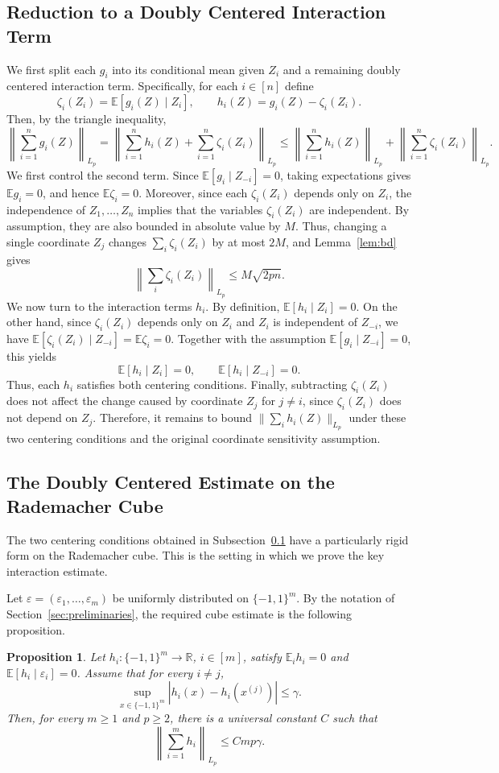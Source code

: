 \documentclass[11pt]{article}
\newtheorem{proposition}{Proposition}
\newcommand{\E}{\mathbb{E}}
\newcommand{\norm}[1]{\left\lVert #1\right\rVert}
\newcommand{\abs}[1]{\left\lvert #1\right\rvert}
\begin{document}
\subsection{Reduction to a Doubly Centered Interaction Term}\label{subsec:reduction}

We first split each $g_i$ into its conditional mean given $Z_i$ and a remaining doubly centered interaction term. Specifically, for each $i \in [n]$  define
\[
\zeta_i(Z_i)=\E[g_i(Z)\mid Z_i], \qquad h_i(Z)=g_i(Z)-\zeta_i(Z_i).
\]
Then, by the triangle inequality, 
\[
\left\|\sum_{i=1}^n g_i(Z) \right\|_{L_p} = \left \| \sum_{i=1}^n h_i(Z) + \sum_{i=1}^n \zeta_i(Z_i) \right\|_{L_p} \le \left\|\sum_{i=1}^n h_i(Z) \right\|_{L_p} + \left\| \sum_{i=1}^n \zeta_i(Z_i) \right\|_{L_p}. 
\]
We first control the second term. Since $\E[g_i\mid Z_{-i}]=0$, taking expectations gives $\E g_i=0$, and hence $\E \zeta_i=0$. Moreover, since each $\zeta_i(Z_i)$ depends only on $Z_i$, the independence of $Z_1,\ldots,Z_n$ implies that the variables $\zeta_i(Z_i)$ are independent. By assumption, they are also bounded in absolute value by $M$. Thus, changing a single coordinate $Z_j$ changes $\sum_i\zeta_i(Z_i)$ by at most $2M$, and Lemma~\ref{lem:bd} gives
\[
\norm{\sum_i \zeta_i(Z_i)}_{L_p} \le M\sqrt{2pn}.
\]
We now turn to the interaction terms $h_i$. By definition, $\E[h_i\mid Z_i]=0$. On the other hand, since $\zeta_i(Z_i)$ depends only on $Z_i$ and $Z_i$ is independent of $Z_{-i}$, we have $\E[\zeta_i(Z_i)\mid Z_{-i}]=\E\zeta_i=0$. Together with the assumption $\E[g_i\mid Z_{-i}]=0$, this yields
\[
\E[h_i\mid Z_i]=0, \qquad \E[h_i\mid Z_{-i}]=0.
\]
Thus, each $h_i$ satisfies both centering conditions. Finally, subtracting $\zeta_i(Z_i)$ does not affect the change caused by coordinate $Z_j$ for $j\neq i$, since $\zeta_i(Z_i)$ does not depend on $Z_j$. Therefore, it remains to bound $\|\sum_i h_i(Z)\|_{L_p}$ under these two centering conditions and the original coordinate sensitivity assumption.

\subsection{The Doubly Centered Estimate on the Rademacher Cube}\label{subsec:cube}

The two centering conditions obtained in Subsection~\ref{subsec:reduction} have a particularly rigid form on the Rademacher cube. This is the setting in which we prove the key interaction estimate.

Let $\varepsilon=(\varepsilon_1,\ldots,\varepsilon_m)$ be uniformly distributed on $\{-1,1\}^m$. By the notation of Section~\ref{sec:preliminaries}, the required cube estimate is the following proposition.
\begin{proposition}\label{prop:cube}
Let $h_i:\{-1,1\}^m\to\mathbb R$, $i\in[m]$, satisfy \(\E_i h_i=0\) and \( \E[h_i\mid\varepsilon_i]=0 \). Assume that for every $i\neq j$,
\[
\sup_{x\in\{-1,1\}^m} \abs{h_i(x)-h_i(x^{(j)})} \le\gamma.
\]
Then, for every $m\ge1$ and $p\ge2$, there is a universal constant $C$ such that
\[
\norm{\sum_{i=1}^m h_i}_{L_p} \le Cmp\gamma.
\]
\end{proposition}
\end{document}
